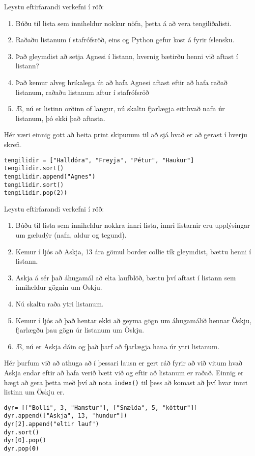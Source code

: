 \begin{exercise}\label{lst6}
Leystu eftirfarandi verkefni í röð:
\begin{enumerate}
	\item Búðu til lista sem inniheldur nokkur nöfn, þetta á að vera tengiliðalisti.
	\item Raðaðu listanum í stafrófsröð, eins og Python gefur kost á fyrir íslensku.
	\item Það gleymdist að setja Agnesi í listann, hvernig bætirðu henni við aftast í listann?
	\item Það kemur alveg hrikalega út að hafa Agnesi aftast eftir að hafa raðað listanum, raðaðu listanum aftur í stafrófsröð
	\item Æ, nú er listinn orðinn of langur, nú skaltu fjarlægja eitthvað nafn úr listanum, þó ekki það aftasta.
\end{enumerate}
\end{exercise}
\begin{Answer}[ref={lst6}]
Hér væri einnig gott að beita print skipunum til að sjá hvað er að gerast í hverju skrefi.
\begin{lstlisting}
tengilidir = ["Halldóra", "Freyja", "Pétur", "Haukur"]
tengilidir.sort()
tengilidir.append("Agnes")
tengilidir.sort()
tengilidir.pop(2))\end{lstlisting}
\end{Answer}

\begin{exercise}\label{lst6}
Leystu eftirfarandi verkefni í röð:
\begin{enumerate}
	\item Búðu til lista sem inniheldur nokkra innri lista, innri listarnir eru upplýsingar um gæludýr (nafn, aldur og tegund).
	\item Kemur í ljós að Askja, 13 ára gömul border collie tík gleymdist, bættu henni í listann.
	\item Askja á sér það áhugamál að elta laufblöð, bættu því aftast í listann sem inniheldur gögnin um Öskju.
	\item Nú skaltu raða ytri listanum.
	\item Kemur í ljós að það hentar ekki að geyma gögn um áhugamálið hennar Öskju, fjarlægðu þau gögn úr listanum um Öskju.
	\item Æ, nú er Askja dáin og það þarf að fjarlægja hana úr ytri listanum.
\end{enumerate}
\end{exercise}
\begin{Answer}[ref={lst6}]
Hér þurfum við að athuga að í þessari lausn er gert ráð fyrir að við vitum hvað Askja endar eftir að hafa verið bætt við og eftir að listanum er raðað.
Einnig er hægt að gera þetta með því að nota \texttt{index()} til þess að komast að því hvar innri listinn um Öskju er.
\begin{lstlisting}
dyr= [["Bolli", 3, "Hamstur"], ["Snælda", 5, "köttur"]]
dyr.append(["Askja", 13, "hundur"])
dyr[2].append("eltir lauf") 
dyr.sort()
dyr[0].pop()
dyr.pop(0)\end{lstlisting}
\end{Answer}